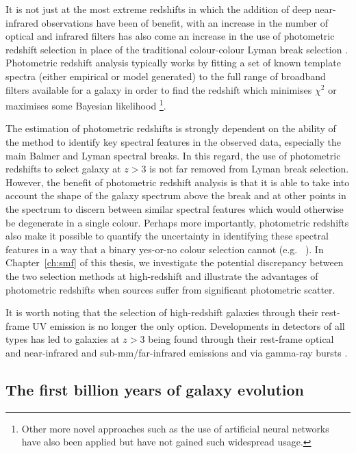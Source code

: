 It is not just at the most extreme redshifts in which the addition of deep near-infrared observations have been of benefit, with an increase in the number of optical and infrared filters has also come an increase in the use of photometric redshift selection in place of the traditional colour-colour Lyman break selection \citep{McLure:2006fg,McLure:2010hq}. Photometric redshift analysis typically works by fitting a set of known template spectra (either empirical or model generated) to the full range of broadband filters available for a galaxy in order to find the redshift which minimises $\chi^{2}$ \citep{Bolzonella:2000uw,Brammer:2008gn} or maximises some Bayesian likelihood \citep{Benitez:2000jr}\footnote{Other more novel approaches such as the use of artificial neural networks \citep{Collister:2004fx} have also been applied but have not gained such widespread usage.}.

The estimation of photometric redshifts is strongly dependent on the ability of the method to identify key spectral features in the observed data, especially the main Balmer and Lyman spectral breaks. In this regard, the use of photometric redshifts to select galaxy at $z > 3$ is not far removed from Lyman break selection. However, the benefit of photometric redshift analysis is that it is able to take into account the shape of the galaxy spectrum above the break and at other points in the spectrum to discern between similar spectral features which would otherwise be degenerate in a single colour. Perhaps more importantly, photometric redshifts also make it possible to quantify the uncertainty in identifying these spectral features in a way that a binary yes-or-no colour selection cannot (e.g. \citeauthor{Dunlop:2007fo}~\citeyear{Dunlop:2007fo}). In Chapter~\ref{ch:smf} of this thesis, we investigate the potential discrepancy between the two selection methods at high-redshift and illustrate the advantages of photometric redshifts when sources suffer from significant photometric scatter.

It is worth noting that the selection of high-redshift galaxies through their rest-frame UV emission is no longer the only option. Developments in detectors of all types has led to galaxies at $z > 3$ being found through their rest-frame optical and near-infrared \citep{Franx:2003cx,vanDokkum:2003bl} and sub-mm/far-infrared \citep{Walter:2003ul,Robson:2004gu} emissions and via gamma-ray bursts \citep{Haislip:2006gx,Kawai:2006kk,Tanvir:2009gq}.

\subsection{The first billion years of galaxy evolution}\label{sec:intro-earlygal}


